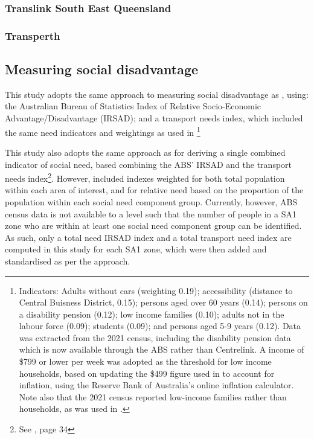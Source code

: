 \documentclass[preprint, 3p,
authoryear]{elsarticle} %
\begin{document}
\subsubsection{Translink South East
Queensland}\label{translink-south-east-queensland}

\subsubsection{Transperth}\label{transperth}

\subsection{Measuring social
disadvantage}\label{measuring-social-disadvantage}

This study adopts the same approach to measuring social disadvantage as
\citet{currie2010identifying}, using: the Australian Bureau of
Statistics Index of Relative Socio-Economic Advantage/Disadvantage
(IRSAD); and a transport needs index, which included the same need
indicators and weightings as used in
\citet{currie2010identifying}\footnote{Indicators: Adults without cars
  (weighting 0.19); accessibility (distance to Central Buisness
  District, 0.15); persons aged over 60 years (0.14); persons on a
  disability pension (0.12); low income families (0.10); adults not in
  the labour force (0.09); students (0.09); and persons aged 5-9 years
  (0.12). Data was extracted from the 2021 census, including the
  disability pension data which is now available through the ABS rather
  than Centrelink. A income of \$799 or lower per week was adopted as
  the threshold for low income households, based on updating the \$499
  figure used in \citet{currie2010identifying} to account for inflation,
  using the Reserve Bank of Australia's online inflation calculator.
  Note also that the 2021 census reported low-income families rather
  than households, as was used in \citet{currie2010identifying}.}

This study also adopts the same approach as
\citet{currie2010identifying} for deriving a single combined indicator
of social need, based combining the ABS' IRSAD and the transport needs
index\footnote{See \citet{currie2010identifying}, page 34}. However,
\citet{currie2010identifying} included indexes weighted for both total
population within each area of interest, and for relative need based on
the proportion of the population within each social need component
group. Currently, however, ABS census data is not available to a level
such that the number of people in a SA1 zone who are within at least one
social need component group can be identified. As such, only a total
need IRSAD index and a total transport need index are computed in this
study for each SA1 zone, which were then added and standardised as per
the \citet{currie2010identifying} approach.
\end{document}
